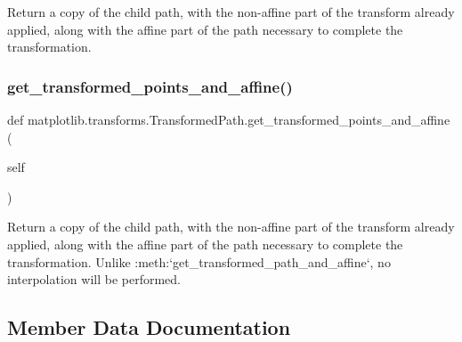 \begin{DoxyVerb}Return a copy of the child path, with the non-affine part of
the transform already applied, along with the affine part of
the path necessary to complete the transformation.
\end{DoxyVerb}
 \mbox{\label{classmatplotlib_1_1transforms_1_1TransformedPath_a29dcaf6458ee4e6c83b07b27a22e4895}} 
\subsubsection{\texorpdfstring{get\+\_\+transformed\+\_\+points\+\_\+and\+\_\+affine()}{get\_transformed\_points\_and\_affine()}}
{\footnotesize\ttfamily def matplotlib.\+transforms.\+Transformed\+Path.\+get\+\_\+transformed\+\_\+points\+\_\+and\+\_\+affine (\begin{DoxyParamCaption}\item[{}]{self }\end{DoxyParamCaption})}

\begin{DoxyVerb}Return a copy of the child path, with the non-affine part of
the transform already applied, along with the affine part of
the path necessary to complete the transformation.  Unlike
:meth:`get_transformed_path_and_affine`, no interpolation will
be performed.
\end{DoxyVerb}
 

\subsection{Member Data Documentation}
\mbox{\label{classmatplotlib_1_1transforms_1_1TransformedPath_a3a044a40e9a73c51b511feaecdac0e9b}} 
